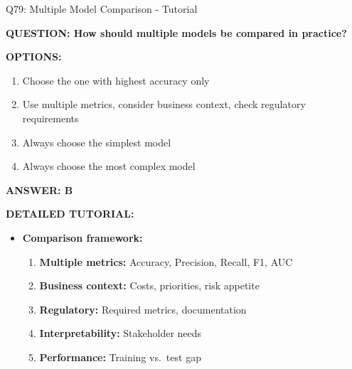 \documentclass[8pt]{beamer}
\begin{document}
\begin{frame}{Q79: Multiple Model Comparison - Tutorial}
	\fontsize{6.5}{7.5}\selectfont
	
	\textbf{QUESTION: How should multiple models be compared in practice?}
	
	\vspace{0.1cm}
	\textbf{OPTIONS:}
	\begin{enumerate}
		\item Choose the one with highest accuracy only
		\item Use multiple metrics, consider business context, check regulatory requirements
		\item Always choose the simplest model
		\item Always choose the most complex model
	\end{enumerate}
	
	\vspace{0.1cm}
	\textcolor{myblue}{\textbf{ANSWER: B}}
	
	\vspace{0.1cm}
	\textbf{DETAILED TUTORIAL:}
	\begin{itemize}
		\item \textbf{Comparison framework:}
		\begin{enumerate}
			\item \textbf{Multiple metrics:} Accuracy, Precision, Recall, F1, AUC
			\item \textbf{Business context:} Costs, priorities, risk appetite
			\item \textbf{Regulatory:} Required metrics, documentation
			\item \textbf{Interpretability:} Stakeholder needs
			\item \textbf{Performance:} Training vs.\ test gap
		\end{enumerate}
	\end{itemize}
	
\end{frame}
\end{document}
